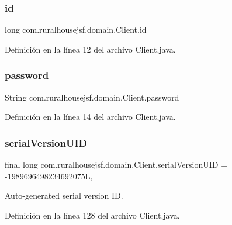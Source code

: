 \subsubsection{\texorpdfstring{id}{id}}
{\footnotesize\ttfamily long com.\+ruralhousejsf.\+domain.\+Client.\+id\hspace{0.3cm}{\ttfamily [private]}}



Definición en la línea 12 del archivo Client.\+java.

\mbox{\label{classcom_1_1ruralhousejsf_1_1domain_1_1_client_a1914bdf0282fd4a34b890a6fb775619e}} 
\subsubsection{\texorpdfstring{password}{password}}
{\footnotesize\ttfamily String com.\+ruralhousejsf.\+domain.\+Client.\+password\hspace{0.3cm}{\ttfamily [private]}}



Definición en la línea 14 del archivo Client.\+java.

\mbox{\label{classcom_1_1ruralhousejsf_1_1domain_1_1_client_a6ac812041b6242509f710f231010ad7f}} 
\subsubsection{\texorpdfstring{serialVersionUID}{serialVersionUID}}
{\footnotesize\ttfamily final long com.\+ruralhousejsf.\+domain.\+Client.\+serial\+Version\+U\+ID = -\/1989696498234692075L\hspace{0.3cm}{\ttfamily [static]}, {\ttfamily [private]}}



Auto-\/generated serial version ID. 



Definición en la línea 128 del archivo Client.\+java.

